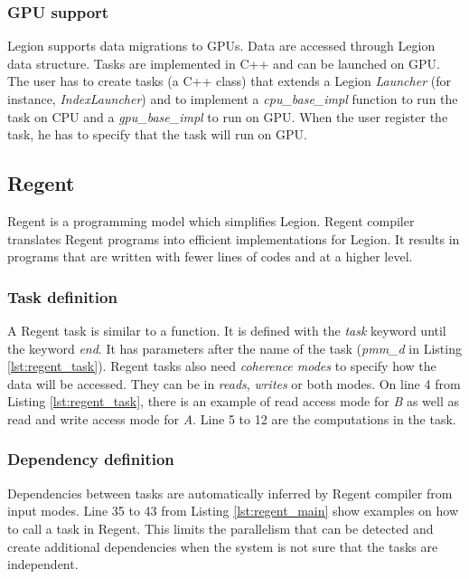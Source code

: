 \subsubsection{GPU support}
Legion supports data migrations to GPUs.
Data are accessed through Legion data structure.
Tasks are implemented in C++ and can be launched on GPU.
The user has to create tasks (a C++ class) that extends a Legion \textit{Launcher} (for instance, \textit{IndexLauncher}) and to implement a \textit{cpu\_base\_impl} function to run the task on CPU and a \textit{gpu\_base\_impl} to run on GPU.
When the user register the task, he has to specify that the task will run on GPU.

\subsection{Regent}
Regent \cite{SLTBA2015} is a programming model which simplifies Legion.
Regent compiler translates Regent programs into efficient implementations for Legion.
It results in programs that are written with fewer lines of codes and at a higher level.

\subsubsection{Task definition}
A Regent task is similar to a function.
It is defined with the \textit{task} keyword until the keyword \textit{end}.
It has parameters after the name of the task (\textit{pmm\_d} in Listing \ref{lst:regent_task}).
Regent tasks also need \textit{coherence modes} to specify how the data will be accessed.
They can be in \textit{reads}, \textit{writes} or both modes.
On line 4 from Listing \ref{lst:regent_task}, there is an example of read access mode for \textit{B} as well as read and write access mode for \textit{A}.
Line 5 to 12 are the computations in the task.


\begin{figure}

\end{figure}

\begin{figure}

\end{figure}

\subsubsection{Dependency definition}
Dependencies between tasks are automatically inferred by Regent compiler from input modes.
Line 35 to 43 from Listing \ref{lst:regent_main} show examples on how to call a task in Regent.
This limits the parallelism that can be detected and create additional dependencies when the system is not sure that the tasks are independent.


